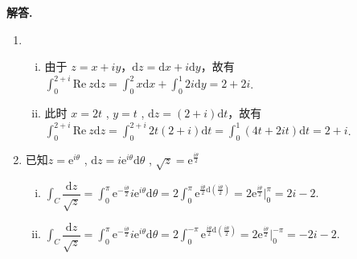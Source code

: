 \documentclass[11pt]{ctexart}
\newenvironment{solution}{\par\noindent\textbf{解答. }}{\par}
\begin{document}
\begin{solution}
    \begin{enumerate}[(1)]
        \item \begin{enumerate}[(i)]
                  \item 由于 $z=x+iy$，$\text{d}z=\text{d}x+i\text{d}y$，故有\\
                        $\displaystyle\int_{0}^{2+i}\text{Re}\ z\text{d}z = \int_{0}^{2}x\text{d}x 
                        + \int_{0}^{1}2i\text{d}y = 2 + 2i$.
                  \item 此时 $x=2t$ , $y=t$ , $\text{d}z=(2+i)\text{d}t$，故有\\
                        $\displaystyle\int_{0}^{2+i}\text{Re}\ z\text{d}z = \int_{0}^{2+i}2t(2+i)\text{d}t 
                        = \int_{0}^{1}(4t+2it)\text{d}t = 2+i$.   
               \end{enumerate}
        \item 已知$z=\text{e}^{i\theta}$ , $\text{d}z=i\text{e}^{i\theta}\text{d}\theta$ , $\sqrt{z}=\text{e}^{\frac{i\theta}{2}}$
              \begin{enumerate}[(i)]
                   \item  $\displaystyle\int_C \dfrac{\text{d}z}{\sqrt{z}} = \int_{0}^{\pi}\text{e}^{-\frac{i\theta}{2}}i\text{e}^{i\theta}\text{d}\theta
                          = 2\int_{0}^{\pi}\text{e}^{\frac{i\theta}{2}\text{d}(\frac{i\theta}{2})}
                          = 2\text{e}^{\frac{i\theta}{2}}|_0^{\pi}
                          = 2i-2$.
                    \item $\displaystyle\int_C \dfrac{\text{d}z}{\sqrt{z}} = \int_{0}^{\pi}\text{e}^{-\frac{i\theta}{2}}i\text{e}^{i\theta}\text{d}\theta
                          = 2\int_{0}^{-\pi}\text{e}^{\frac{i\theta}{2}\text{d}(\frac{i\theta}{2})}
                          = 2\text{e}^{\frac{i\theta}{2}}|_0^{-\pi}
                          = -2i-2$.              
              \end{enumerate}
    \end{enumerate}
\end{solution}
\end{document}
